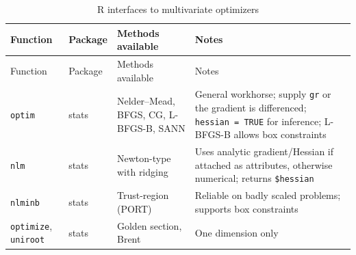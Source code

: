 \documentclass[
  letterpaper,
  DIV=11,
  numbers=noendperiod]{scrreprt}
\begin{document}
\begin{longtable}[]{@{}
  >{\raggedright\arraybackslash}p{}
  >{\raggedright\arraybackslash}p{}
  >{\raggedright\arraybackslash}p{}
  >{\raggedright\arraybackslash}p{}@{}}
\caption{R interfaces to multivariate
optimizers}\label{tbl-r-functions}\tabularnewline
\toprule\noalign{}
\begin{minipage}[b]{\linewidth}\raggedright
Function
\end{minipage} & \begin{minipage}[b]{\linewidth}\raggedright
Package
\end{minipage} & \begin{minipage}[b]{\linewidth}\raggedright
Methods available
\end{minipage} & \begin{minipage}[b]{\linewidth}\raggedright
Notes
\end{minipage} \\
\midrule\noalign{}
\endfirsthead
\toprule\noalign{}
\begin{minipage}[b]{\linewidth}\raggedright
Function
\end{minipage} & \begin{minipage}[b]{\linewidth}\raggedright
Package
\end{minipage} & \begin{minipage}[b]{\linewidth}\raggedright
Methods available
\end{minipage} & \begin{minipage}[b]{\linewidth}\raggedright
Notes
\end{minipage} \\
\midrule\noalign{}
\endhead
\bottomrule\noalign{}
\endlastfoot
\texttt{optim} & stats & Nelder--Mead, BFGS, CG, L-BFGS-B, SANN &
General workhorse; supply \texttt{gr} or the gradient is differenced;
\texttt{hessian\ =\ TRUE} for inference; L-BFGS-B allows box
constraints \\
\texttt{nlm} & stats & Newton-type with ridging & Uses analytic
gradient/Hessian if attached as attributes, otherwise numerical; returns
\texttt{\$hessian} \\
\texttt{nlminb} & stats & Trust-region (PORT) & Reliable on badly scaled
problems; supports box constraints \\
\texttt{optimize}, \texttt{uniroot} & stats & Golden section, Brent &
One dimension only \\

\end{longtable}
\end{document}
